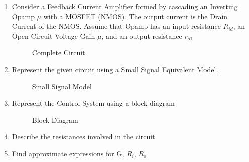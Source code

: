 \begin{enumerate}[label=\thesubsection.\arabic*.,ref=\thesubsection.\theenumi]
\item
Consider a Feedback Current Amplifier formed by cascading an Inverting Opamp $\mu$ with a MOSFET (NMOS).
The output current is the Drain Current of the NMOS.
Assume that Opamp has an input resistance $R_{id}$, an Open Circuit Voltage Gain $\mu$, and an output resistance $r_{o1}$

\begin{figure}[!ht]
	\begin{center}
		\resizebox{\columnwidth}{!}{}
	\end{center}
\caption{Complete Circuit}
\label{fig:Complete_Circuit}
\end{figure}

\item
Represent the given circuit using a Small Signal Equivalent Model.

\solution
\begin{figure}[!ht]
	\begin{center}
		\resizebox{\columnwidth}{!}{}
	\end{center}
\caption{Small Signal Model}
\label{fig:Small_Signal_Model}
\end{figure}

\item
Represent the Control System using a block diagram

\solution
\begin{figure}[!ht]
	\begin{center}
			\resizebox{\columnwidth}{!}{}
	\end{center}
\caption{Block Diagram}
\label{fig:Block_Diagram}
\end{figure}

\item
Describe the resistances involved in the circuit

\solution
\begin{table}[!ht]
\centering

\caption{}
\label{table: Resistance_Table}
\end{table}

\item
Find approximate expressions for G, $R_{i}$, $R_{o}$


\end{enumerate}
